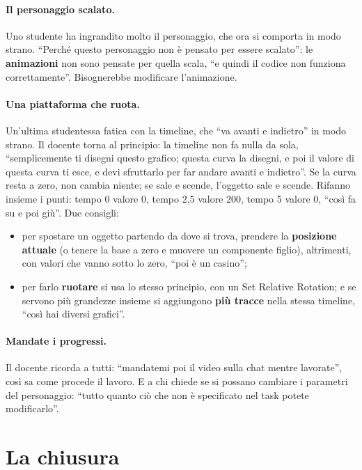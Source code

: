 \paragraph{Il personaggio scalato.} Uno studente ha ingrandito molto il
personaggio, che ora si comporta in modo strano. ``Perché questo personaggio non
è pensato per essere scalato'': le \textbf{animazioni} non sono pensate per
quella scala, ``e quindi il codice non funziona correttamente''. Bisognerebbe
modificare l'animazione.

\paragraph{Una piattaforma che ruota.} Un'ultima studentessa fatica con la
timeline, che ``va avanti e indietro'' in modo strano. Il docente torna al
principio: la timeline non fa nulla da sola, ``semplicemente ti disegni questo
grafico; questa curva la disegni, e poi il valore di questa curva ti esce, e devi
sfruttarlo per far andare avanti e indietro''. Se la curva resta a zero, non
cambia niente; se sale e scende, l'oggetto sale e scende. Rifanno insieme i
punti: tempo 0 valore 0, tempo 2,5 valore 200, tempo 5 valore 0, ``così fa su e
poi giù''. Due consigli:
\begin{itemize}
  \item per spostare un oggetto partendo da dove si trova, prendere la
        \textbf{posizione attuale} (o tenere la base a zero e muovere un
        componente figlio), altrimenti, con valori che vanno sotto lo zero,
        ``poi è un casino'';
  \item per farlo \textbf{ruotare} si usa lo stesso principio, con un Set
        Relative Rotation; e se servono più grandezze insieme si aggiungono
        \textbf{più tracce} nella stessa timeline, ``così hai diversi
        grafici''.
\end{itemize}

\paragraph{Mandate i progressi.} Il docente ricorda a tutti: ``mandatemi poi il
video sulla chat mentre lavorate'', così sa come procede il lavoro. E a chi chiede
se si possano cambiare i parametri del personaggio: ``tutto quanto ciò che non è
specificato nel task potete modificarlo''.

\section{La chiusura}
\label{gd12:sec:chiusura}

